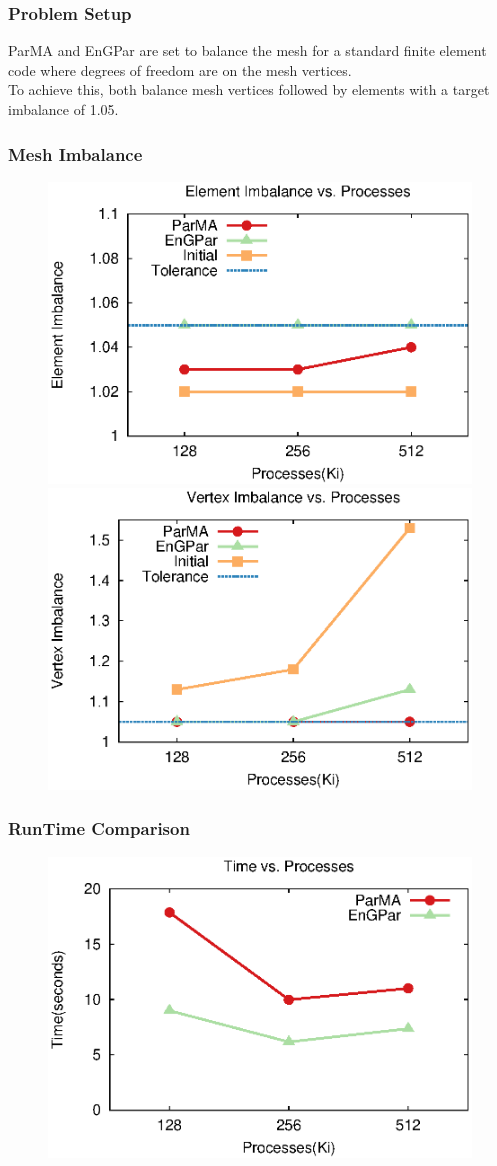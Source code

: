 \documentclass{beamer}
\begin{document}
\begin{frame}
  \frametitle{Problem Setup}
  ParMA and EnGPar are set to balance the mesh for a standard finite element code where degrees of freedom are on the mesh vertices. \\
  \smallskip
  To achieve this, both balance mesh vertices followed by elements with a target imbalance of 1.05. \\
  
\end{frame}

\begin{frame}
  \frametitle{Mesh Imbalance}
  \begin{figure}
    \centering
    \includegraphics[width=.5\textwidth]{figures/eimb_v_cores.eps}
    \includegraphics[width=.5\textwidth]{figures/vimb_v_cores.eps}
  \end{figure}  
\end{frame}

\begin{frame}
  \frametitle{RunTime Comparison}
  \begin{figure}
    \centering
    \includegraphics[width=.8\textwidth]{figures/time_v_cores.eps}
  \end{figure}
  
\end{frame}
\end{document}
